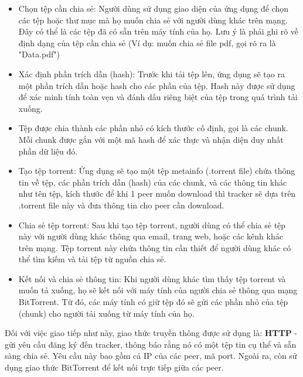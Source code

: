 \begin{itemize}
    \item Chọn tệp cần chia sẻ: Người dùng sử dụng giao diện của ứng dụng để chọn các tệp hoặc
    thư mục mà họ muốn chia sẻ với người dùng khác trên mạng. Đây có thể là các tệp đã có
    sẵn trên máy tính của họ. Lưu ý là phải ghi rõ về định dạng của tệp cần chia sẻ (Ví dụ: muốn chia sẻ file pdf, gọi rõ ra là "Data.pdf")
    \item Xác định phần trích dẫn (hash): Trước khi tải tệp lên, ứng dụng sẽ tạo ra một phần trích
    dẫn hoặc hash cho các phần của tệp. Hash này được sử dụng để xác minh tính toàn vẹn và đánh dấu riêng biệt
    của tệp trong quá trình tải xuống.
    \item Tệp được chia thành các phần nhỏ có kích thước cố định, gọi là các chunk. Mỗi chunk được gắn với một mã hash để xác thực và nhận diện duy nhất phần dữ liệu đó.
    \item Tạo tệp torrent: Ứng dụng sẽ tạo một tệp metainfo (.torrent file) chứa thông tin về tệp,
    các phần trích dẫn (hash) của các chunk, và các thông tin khác như tên tệp, kích thước để khi 1 peer muốn download thì tracker sẽ dựa trên .torrent file này và đưa thông tin cho peer cần download.
    \item Chia sẻ tệp torrent: Sau khi tạo tệp torrent, người dùng có thể chia sẻ tệp này với người
    dùng khác thông qua email, trang web, hoặc các kênh khác trên mạng. Tệp torrent này
    chứa thông tin cần thiết để người dùng khác có thể tìm kiếm và tải tệp từ nguồn chia sẻ.
    \item Kết nối và chia sẻ thông tin: Khi người dùng khác tìm thấy tệp torrent và muốn tả
    xuống, họ sẽ kết nối với máy tính của người chia sẻ thông qua mạng BitTorrent. Từ đó, các máy tính có giữ tệp đó
    sẽ gửi các phần nhỏ của tệp (chunk) cho người tải xuống từ máy tính của họ.
\end{itemize}
Đối với việc giao tiếp như này, giao thức truyền thông được sử dụng là: \textbf{HTTP} - gửi yêu cầu đăng ký đến tracker, thông báo rằng nó có một tệp tin cụ thể 
và sẵn sàng chia sẻ. Yêu cầu này bao gồm cả IP của các peer, mã port. Ngoài ra, còn sử dụng giao thức BitTorrent để kết nối trực tiếp giữa các peer.

